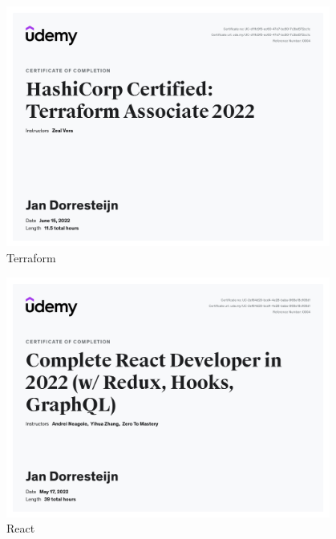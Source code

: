 {{		{
		}
	}
	{%
		\begin{figure}[H]
			\begin{center}
				\includegraphics[width=0.95\textwidth]{images/terra.jpg}
			\end{center}
			\caption{Terraform}
			\label{fig:terraform}
		\end{figure}
		\begin{figure}[H]
			\begin{center}
				\includegraphics[width=0.95\textwidth]{images/react.jpg}
			\end{center}
			\caption{React}
			\label{fig:react}
		\end{figure}
		\begin{figure}[H]
			\begin{center}

\end{center}
\end{figure}}}
